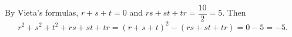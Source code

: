 By Vieta's formulas, $r+s+t=0$ and $rs+st+tr=\dfrac{10}{2}=5$. Then
\[
r^2+s^2+t^2+rs+st+tr=(r+s+t)^2-(rs+st+tr)=0-5=\boxed{-5}.
\]
